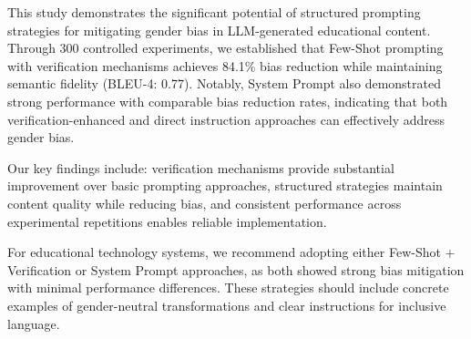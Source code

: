 This study demonstrates the significant potential of structured prompting strategies for mitigating gender bias in LLM-generated educational content. Through 300 controlled experiments, we established that Few-Shot prompting with verification mechanisms achieves 84.1\% bias reduction while maintaining semantic fidelity (BLEU-4: 0.77). Notably, System Prompt also demonstrated strong performance with comparable bias reduction rates, indicating that both verification-enhanced and direct instruction approaches can effectively address gender bias.

Our key findings include: verification mechanisms provide substantial improvement over basic prompting approaches, structured strategies maintain content quality while reducing bias, and consistent performance across experimental repetitions enables reliable implementation.

For educational technology systems, we recommend adopting either Few-Shot + Verification or System Prompt approaches, as both showed strong bias mitigation with minimal performance differences. These strategies should include concrete examples of gender-neutral transformations and clear instructions for inclusive language.
